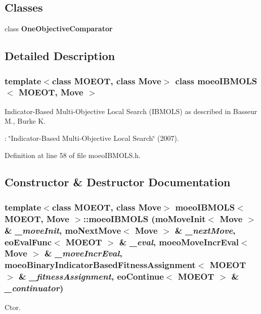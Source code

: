 \subsection*{Classes}
\begin{CompactItemize}
\item 
class \bf{One\-Objective\-Comparator}
\end{CompactItemize}


\subsection{Detailed Description}
\subsubsection*{template$<$class MOEOT, class Move$>$ class moeo\-IBMOLS$<$ MOEOT, Move $>$}

Indicator-Based Multi-Objective Local Search (IBMOLS) as described in Basseur M., Burke K. 

: \char`\"{}Indicator-Based Multi-Objective Local Search\char`\"{} (2007). 



Definition at line 58 of file moeo\-IBMOLS.h.

\subsection{Constructor \& Destructor Documentation}
\subsubsection{\setlength{\rightskip}{0pt plus 5cm}template$<$class MOEOT, class Move$>$ \bf{moeo\-IBMOLS}$<$ MOEOT, Move $>$::\bf{moeo\-IBMOLS} (mo\-Move\-Init$<$ Move $>$ \& {\em \_\-move\-Init}, mo\-Next\-Move$<$ Move $>$ \& {\em \_\-next\-Move}, \bf{eo\-Eval\-Func}$<$ MOEOT $>$ \& {\em \_\-eval}, \bf{moeo\-Move\-Incr\-Eval}$<$ Move $>$ \& {\em \_\-move\-Incr\-Eval}, \bf{moeo\-Binary\-Indicator\-Based\-Fitness\-Assignment}$<$ MOEOT $>$ \& {\em \_\-fitness\-Assignment}, \bf{eo\-Continue}$<$ MOEOT $>$ \& {\em \_\-continuator})\hspace{0.3cm}{\tt  [inline]}}\label{classmoeoIBMOLS_6d6a39ad3d5e4c298d450d801098e274}


Ctor. 

